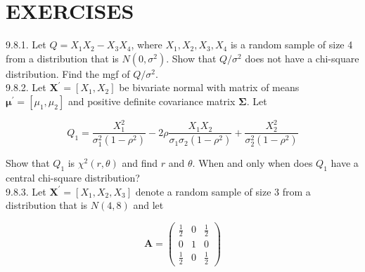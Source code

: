 \section*{EXERCISES}
9.8.1. Let $Q=X_{1} X_{2}-X_{3} X_{4}$, where $X_{1}, X_{2}, X_{3}, X_{4}$ is a random sample of size 4 from a distribution that is $N\left(0, \sigma^{2}\right)$. Show that $Q / \sigma^{2}$ does not have a chi-square distribution. Find the mgf of $Q / \sigma^{2}$.\\
9.8.2. Let $\mathbf{X}^{\prime}=\left[X_{1}, X_{2}\right]$ be bivariate normal with matrix of means $\boldsymbol{\mu}^{\prime}=\left[\mu_{1}, \mu_{2}\right]$ and positive definite covariance matrix $\boldsymbol{\Sigma}$. Let

$$
Q_{1}=\frac{X_{1}^{2}}{\sigma_{1}^{2}\left(1-\rho^{2}\right)}-2 \rho \frac{X_{1} X_{2}}{\sigma_{1} \sigma_{2}\left(1-\rho^{2}\right)}+\frac{X_{2}^{2}}{\sigma_{2}^{2}\left(1-\rho^{2}\right)}
$$

Show that $Q_{1}$ is $\chi^{2}(r, \theta)$ and find $r$ and $\theta$. When and only when does $Q_{1}$ have a central chi-square distribution?\\
9.8.3. Let $\mathbf{X}^{\prime}=\left[X_{1}, X_{2}, X_{3}\right]$ denote a random sample of size 3 from a distribution that is $N(4,8)$ and let

$$
\mathbf{A}=\left(\begin{array}{ccc}
\frac{1}{2} & 0 & \frac{1}{2} \\
0 & 1 & 0 \\
\frac{1}{2} & 0 & \frac{1}{2}
\end{array}\right)
$$

